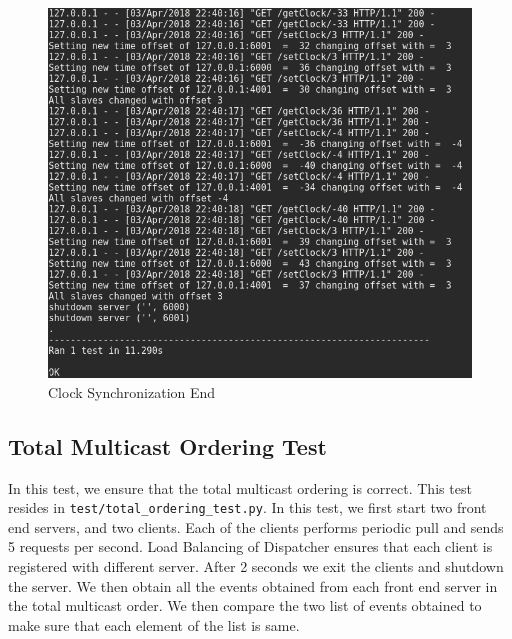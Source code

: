 \documentclass{article}
\begin{document}
\begin{figure}[H]
        \centering
        \includegraphics[width=\textwidth]{outputs/clock_sync_test_end.png}
        \caption{Clock Synchronization End \label{fig:clonk_synchronization}}
\end{figure}

\subsection{Total Multicast Ordering Test}
In this test, we ensure that the total multicast ordering is correct.
This test resides in \texttt{test/total\_ordering\_test.py}. In this test, we
first start two front end servers, and two clients. Each of the clients performs
periodic pull and sends 5 requests per second. Load Balancing of Dispatcher
ensures that each client is registered with different server. After 2 seconds
we exit the clients and shutdown the server. We then obtain all the events
obtained from each front end server in the total multicast order. We then
compare the two list of events obtained to make sure that each element of the 
list is same.
\end{document}
